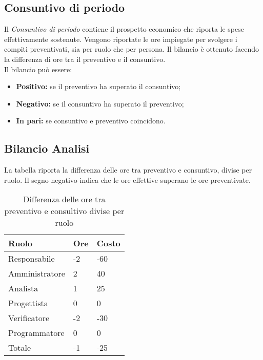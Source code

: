 \begin{flushleft}
    \chapter{Consuntivo di periodo}
    Il \textit{Consuntivo di periodo} contiene il prospetto economico che riporta le spese effettivamente sostenute. Vengono riportate le ore impiegate per svolgere i compiti preventivati, sia per
    ruolo che per persona. Il bilancio è ottenuto facendo la differenza di ore tra il preventivo e il consuntivo.\\
    Il bilancio può essere:
    \begin{itemize}
        \item \textbf{Positivo:} se il preventivo ha superato il consuntivo;
        \item \textbf{Negativo:} se il consuntivo ha superato il preventivo;
        \item \textbf{In pari:} se consuntivo e preventivo coincidono.
    \end{itemize}

    \section{Bilancio Analisi}
    La tabella riporta la differenza delle ore tra preventivo e consuntivo, divise per ruolo. Il segno negativo indica che le ore effettive superano le ore preventivate.  
      
    \begin{table}[h]
    	\centering
        \begin{tabular}{|l|l|l|}
        \hline
        Ruolo          & Ore & Costo \\ \hline
        Responsabile   & -2  & -60   \\ \hline
        Amministratore & 2   & 40    \\ \hline
        Analista       & 1   & 25    \\ \hline
        Progettista    & 0   & 0     \\ \hline
        Verificatore   & -2  & -30   \\ \hline
        Programmatore  & 0   & 0     \\ \hline
        Totale         & -1   & -25   \\ \hline
        \end{tabular}
       \caption{Differenza delle ore tra preventivo e consultivo divise per ruolo}
    \end{table}


\end{flushleft}
